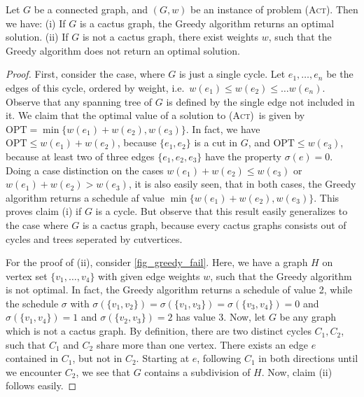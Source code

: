 \documentclass[runningheads]{llncs}
\numberwithin{equation}{section}
\newcommand{\set}[1]{\{ #1 \}}
\newcommand{\fromto}[2]{\set{#1, \ldots, #2}}
\newcommand{\act}{\textsc{(Act)}}
\begin{document}
\begin{theorem}
Let $G$ be a connected graph, and $(G, w)$ be an instance of problem \act. Then we have: (i) If $G$ is a cactus graph, the Greedy algorithm returns an optimal solution. (ii) If $G$ is not a cactus graph, there exist weights $w$, such that the Greedy algorithm does not return an optimal solution.
\end{theorem}
\begin{proof}
First, consider the case, where $G$ is just a single cycle. Let $e_1, \dots, e_n$ be the edges of this cycle, ordered by weight, i.e.\ $w(e_1) \leq w(e_2) \leq \dots w(e_n)$. Observe that any spanning tree of $G$ is defined by the single edge not included in it. We claim that the optimal value of a solution to \act\ is given by  $\text{OPT} = \min\set{w(e_1) + w(e_2), w(e_3)}$. In fact, we have $\text{OPT} \leq w(e_1) + w(e_2)$, because $\set{e_1, e_2}$ is a cut in $G$, and $\text{OPT} \leq w(e_3)$, because at least two of three edges $\set{e_1, e_2, e_3}$ have the property $\sigma(e) = 0$. Doing a case distinction on the cases $w(e_1) + w(e_2) \leq w(e_3)$ or $w(e_1) + w(e_2) > w(e_3)$, it is also easily seen, that in both cases, the Greedy algorithm returns a schedule af value $\min\set{w(e_1) + w(e_2), w(e_3)}$. This proves claim (i) if $G$ is a cycle. But observe that this result easily generalizes to the case where $G$ is a cactus graph, because every cactus graphs consists out of cycles and trees seperated by cutvertices.

For the proof of (ii), consider \cref{fig_greedy_fail}. Here, we have a graph $H$ on vertex set $\fromto{v_1}{v_4}$ with given edge weights $w$, such that the Greedy algorithm is not optimal. In fact, the Greedy algorithm returns a schedule of value 2, while the schedule $\sigma$ with $\sigma(\set{v_1,v_2}) = \sigma(\set{v_1,v_3}) = \sigma(\set{v_3,v_4}) = 0$ and $\sigma(\set{v_1,v_4}) = 1$ and $\sigma(\set{v_2,v_3}) = 2$ has value 3. Now, let $G$ be any graph which is not a cactus graph. By definition, there are two distinct cycles $C_1, C_2$, such that $C_1$ and $C_2$ share more than one vertex. There exists an edge $e$ contained in $C_1$, but not in $C_2$. Starting at $e$, following $C_1$ in both directions until we encounter $C_2$, we see that $G$ contains a subdivision of $H$. Now, claim (ii) follows easily.
\end{proof}
\end{document}
